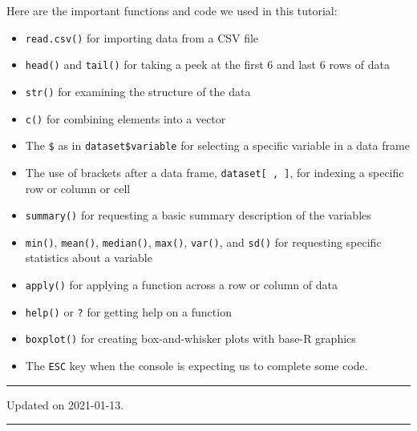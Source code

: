 \documentclass[
]{article}
\providecommand{\tightlist}{%
  \setlength{\itemsep}{0pt}\setlength{\parskip}{0pt}}
\begin{document}
Here are the important functions and code we used in this tutorial:

\begin{itemize}
\tightlist
\item
  \texttt{read.csv()} for importing data from a CSV file\\
\item
  \texttt{head()} and \texttt{tail()} for taking a peek at the first 6 and last 6 rows of data\\
\item
  \texttt{str()} for examining the structure of the data
\item
  \texttt{c()} for combining elements into a vector
\item
  The \texttt{\$} as in \texttt{dataset\$variable} for selecting a specific variable in a data frame
\item
  The use of brackets after a data frame, \texttt{dataset{[}\ ,\ {]}}, for indexing a specific row or column or cell
\item
  \texttt{summary()} for requesting a basic summary description of the variables
\item
  \texttt{min()}, \texttt{mean()}, \texttt{median()}, \texttt{max()}, \texttt{var()}, and \texttt{sd()} for requesting specific statistics about a variable
\item
  \texttt{apply()} for applying a function across a row or column of data
\item
  \texttt{help()} or \texttt{?} for getting help on a function
\item
  \texttt{boxplot()} for creating box-and-whisker plots with base-R graphics
\item
  The \texttt{ESC} key when the console is expecting us to complete some code.
\end{itemize}

\begin{center}\rule{0.5\linewidth}{0.5pt}\end{center}

Updated on 2021-01-13.

\begin{center}\rule{0.5\linewidth}{0.5pt}\end{center}

  
\end{document}
